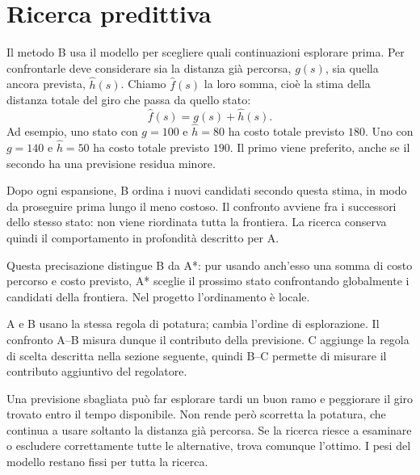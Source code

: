 \section{Ricerca predittiva}
\label{sec:predictive}
Il metodo B usa il modello per scegliere quali continuazioni esplorare prima.
Per confrontarle deve considerare sia la distanza già percorsa, $g(s)$,
sia quella ancora prevista, $\widehat h(s)$. Chiamo $\widehat f(s)$ la loro
somma, cioè la stima della distanza totale del giro che passa da quello stato:
\[
 \widehat f(s)=g(s)+\widehat h(s).
\]
Ad esempio, uno stato con $g=100$ e $\widehat h=80$ ha costo totale previsto
$180$. Uno con $g=140$ e $\widehat h=50$ ha costo totale previsto $190$.
Il primo viene preferito, anche se il secondo ha una previsione residua minore.

Dopo ogni espansione, B ordina i nuovi candidati secondo questa stima,
in modo da proseguire prima lungo il meno costoso. Il confronto avviene
fra i successori dello stesso stato: non viene riordinata tutta la frontiera.
La ricerca conserva quindi il comportamento in profondità descritto per A.

Questa precisazione distingue B da A*: pur usando anch'esso una somma di
costo percorso e costo previsto, A* sceglie il prossimo stato confrontando
globalmente i candidati della frontiera. Nel progetto l'ordinamento è locale.

A e B usano la stessa regola di potatura; cambia l'ordine di esplorazione.
Il confronto A--B misura dunque il contributo della previsione. C aggiunge
la regola di scelta descritta nella sezione seguente, quindi B--C permette
di misurare il contributo aggiuntivo del regolatore.

Una previsione sbagliata può far esplorare tardi un buon ramo e peggiorare
il giro trovato entro il tempo disponibile. Non rende però scorretta la
potatura, che continua a usare soltanto la distanza già percorsa.
Se la ricerca riesce a esaminare o escludere correttamente tutte le
alternative, trova comunque l'ottimo. I pesi del modello restano fissi
per tutta la ricerca.
